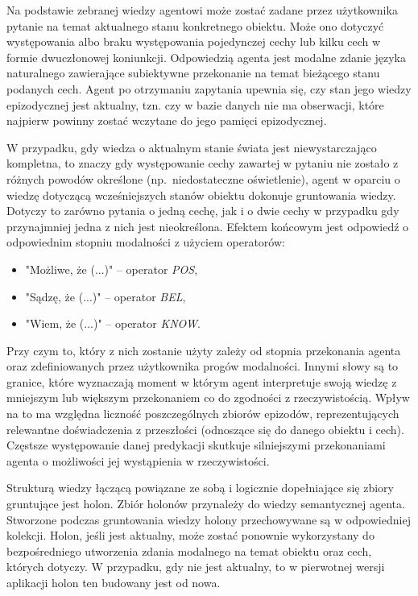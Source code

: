 Na podstawie zebranej wiedzy agentowi może zostać zadane przez użytkownika pytanie na temat aktualnego stanu konkretnego obiektu. Może ono dotyczyć występowania albo braku występowania pojedynczej cechy lub kilku cech w formie dwuczłonowej koniunkcji. Odpowiedzią agenta jest modalne zdanie języka naturalnego zawierające subiektywne przekonanie na temat bieżącego stanu podanych cech. Agent po otrzymaniu zapytania upewnia się, czy stan jego wiedzy epizodycznej jest aktualny, tzn. czy w bazie danych nie ma obserwacji, które najpierw powinny zostać wczytane do jego pamięci epizodycznej.

W przypadku, gdy wiedza o aktualnym stanie świata jest niewystarczająco kompletna, to znaczy gdy występowanie cechy zawartej w pytaniu nie zostało z różnych powodów określone (np.\ niedostateczne oświetlenie), agent w oparciu o wiedzę dotyczącą wcześniejszych stanów obiektu dokonuje gruntowania wiedzy. Dotyczy to zarówno pytania o jedną cechę, jak i o dwie cechy w przypadku gdy przynajmniej jedna z nich jest nieokreślona. Efektem końcowym jest odpowiedź o odpowiednim stopniu modalności z użyciem operatorów: 

\begin{itemize}
	\setlength{\itemindent}{.5in}
	\item "Możliwe, że (...)" -- operator \textit{POS},
	\item "Sądzę, że (...)" -- operator \textit{BEL},
	\item "Wiem, że (...)" -- operator \textit{KNOW}.
\end{itemize}  

Przy czym to, który z nich zostanie użyty zależy od stopnia przekonania agenta oraz zdefiniowanych przez użytkownika progów modalności. Innymi słowy są to granice, które wyznaczają moment w którym agent interpretuje swoją wiedzę z mniejszym lub większym przekonaniem co do zgodności z rzeczywistością. Wpływ na to ma względna liczność poszczególnych zbiorów epizodów, reprezentujących relewantne doświadczenia z przeszłości (odnoszące się do danego obiektu i cech). Częstsze występowanie danej predykacji skutkuje silniejszymi przekonaniami agenta o możliwości jej wystąpienia w rzeczywistości.

Strukturą wiedzy łączącą powiązane ze sobą i logicznie dopełniające się zbiory gruntujące jest holon. Zbiór holonów przynależy do wiedzy semantycznej agenta. Stworzone podczas gruntowania wiedzy holony przechowywane są w odpowiedniej kolekcji. Holon, jeśli jest aktualny, może zostać ponownie wykorzystany do bezpośredniego utworzenia zdania modalnego na temat obiektu oraz cech, których dotyczy. W przypadku, gdy nie jest aktualny, to w pierwotnej wersji aplikacji holon ten budowany jest od nowa.

